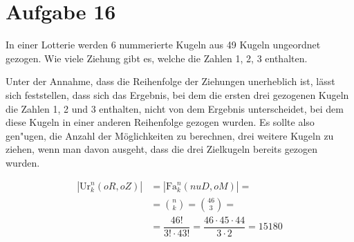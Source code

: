 \section{Aufgabe 16}
\setcounter{section}{16}

In einer Lotterie werden 6 nummerierte Kugeln aus 49 Kugeln
ungeordnet gezogen. Wie viele Ziehung gibt es, welche die Zahlen
1, 2, 3 enthalten.

Unter der Annahme, dass die Reihenfolge der Ziehungen unerheblich
ist, lässt sich feststellen, dass sich das Ergebnis, bei dem die
ersten drei gezogenen Kugeln die Zahlen 1, 2 und 3 enthalten,
nicht von dem Ergebnis unterscheidet, bei dem diese Kugeln in
einer anderen Reihenfolge gezogen wurden. Es sollte also gen"ugen,
die Anzahl der Möglichkeiten zu berechnen, drei weitere Kugeln zu
ziehen, wenn man davon ausgeht, dass die drei Zielkugeln bereits
gezogen wurden.

\begin{equation*}
    \begin{aligned}
        |\text{Ur}^n_k(oR, oZ)| &= |\text{Fa}^n_k(nuD, oM)| = \\[5pt]
                                &= \binom{n}{k} = \binom{46}{3} = \\[5pt]
                                &= \dfrac{46!}{3!\cdot43!} = \dfrac{46 \cdot 45 \cdot 44}{3 \cdot 2} = 15180
    \end{aligned}
\end{equation*}
